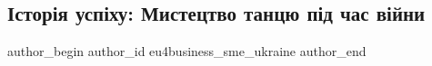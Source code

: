  
 
 
 
 

\subsection{Історія успіху: Мистецтво танцю під час війни}
\label{sec:16_03_2023.fb.eu4business_sme_ukraine.1.mystectvo_tancju_mariupol_vijna}

\ifcmt
 author_begin
   author_id eu4business_sme_ukraine
 author_end
\fi

